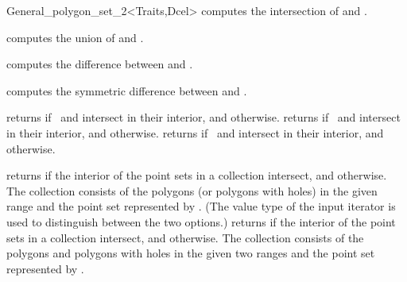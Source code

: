 \begin{ccRefClass}{General_polygon_set_2<Traits,Dcel>}
  {computes the intersection of  and .}

  {computes the union of  and .}

  {computes the difference between  and .}

  {computes the symmetric difference between  and .}
  
\ccQueryFunctions

\ccThreeToTwo

  {returns  if \ccVar\ and  intersect in their
  interior, and  otherwise.}
\ccGlue
{}
  {returns  if \ccVar\ and  intersect in their
  interior, and  otherwise.}
\ccGlue
{}
  {returns  if \ccVar\ and  intersect in their
  interior, and  otherwise.}
  
  {returns  if the interior of the point sets in a collection 
   intersect, and  otherwise. The collection consists of the 
   polygons (or polygons with holes) in the given range and the point set 
   represented by \ccVar. (The value type of the input iterator is used to 
   distinguish between the two options.)}
\ccGlue
{}
  {returns  if the interior of the point sets in a collection 
   intersect, and  otherwise. The collection consists of the 
   polygons and polygons with holes in the given two ranges and the point 
   set represented by \ccVar.}


\end{ccRefClass}
